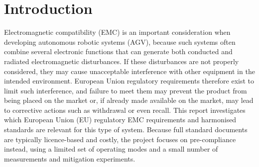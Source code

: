 \section{Introduction}
Electromagnetic compatibility (EMC) is an important consideration when developing autonomous robotic systems (AGV), because such systems often combine several electronic functions that can generate both conducted and radiated electromagnetic disturbances. If these disturbances are not properly considered, they may cause unacceptable interference with other equipment in the intended environment. European Union regulatory requirements therefore exist to limit such interference, and failure to meet them may prevent the product from being placed on the market or, if already made available on the market, may lead to corrective actions such as withdrawal or even recall. This report investigates which European Union (EU) regulatory EMC requirements and harmonised standards are relevant for this type of system. Because full standard documents are typically licence-based and costly, the project focuses on pre-compliance instead, using a limited set of operating modes and a small number of measurements and mitigation experiments.
